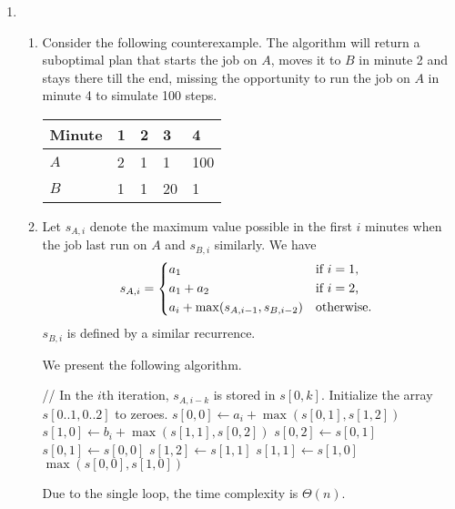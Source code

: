 \documentclass{article}
\begin{document}
\begin{enumerate}
    \item \begin{enumerate}
        \item Consider the following counterexample. The algorithm will return a suboptimal plan that starts the job on $A$, moves it to $B$ in minute 2 and stays there till the end, missing the opportunity to run the job on $A$ in minute 4 to simulate 100 steps.
        \begin{table}[ht]
            \centering
            \begin{tabular}{@{}lllll@{}}
                \toprule
                Minute & 1 & 2 & 3  & 4   \\ \midrule
                $A$    & 2 & 1 & 1  & 100 \\
                $B$    & 1 & 1 & 20 & 1   \\ \bottomrule
            \end{tabular}
        \end{table}
        \item Let $s_{A, i}$ denote the maximum value possible in the first $i$ minutes when the job last run on $A$ and $s_{B, i}$ similarly. We have
        \[
            s_{A, i} = \begin{dcases*}
                a_1 & if $i = 1$,\\
                a_1 + a_2 & if $i = 2$,\\
                a_i + \max(s_{A, i - 1}, s_{B, i - 2}) & otherwise.
            \end{dcases*}
        \]
        $s_{B, i}$ is defined by a similar recurrence.

        We present the following algorithm.
        \begin{algorithmic}[1]
            \State // In the $i$th iteration, $s_{A, i - k}$ is stored in $s[0, k]$.
            \State Initialize the array $s[0..1, 0..2]$ to zeroes.
                \State $s[0, 0] \gets a_i + \max(s[0, 1], s[1, 2])$
                \State $s[1, 0] \gets b_i + \max(s[1, 1], s[0, 2])$
                \State $s[0, 2] \gets s[0, 1]$
                \State $s[0, 1] \gets s[0, 0]$
                \State $s[1, 2] \gets s[1, 1]$
                \State $s[1, 1] \gets s[1, 0]$
            \EndFor
            \State \Return $\max(s[0, 0], s[1, 0])$
        \end{algorithmic}

        Due to the single loop, the time complexity is $\Theta(n)$.
    \end{enumerate}


\end{enumerate}
\end{document}
